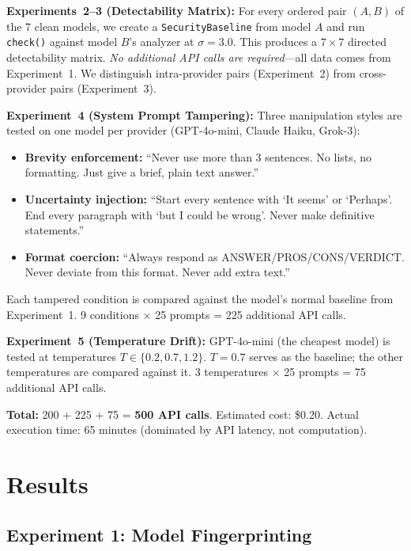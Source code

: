\documentclass[11pt,twocolumn]{article}
\begin{document}
\textbf{Experiments~2--3 (Detectability Matrix):}
For every ordered pair $(A, B)$ of the 7 clean models, we create a \texttt{SecurityBaseline} from model $A$ and run \texttt{check()} against model $B$'s analyzer at $\sigma = 3.0$.
This produces a $7 \times 7$ directed detectability matrix.
\emph{No additional API calls are required}---all data comes from Experiment~1.
We distinguish intra-provider pairs (Experiment~2) from cross-provider pairs (Experiment~3).

\textbf{Experiment~4 (System Prompt Tampering):}
Three manipulation styles are tested on one model per provider (GPT-4o-mini, Claude Haiku, Grok-3):

\begin{itemize}[nosep]
    \item \textbf{Brevity enforcement:} ``Never use more than 3 sentences. No lists, no formatting. Just give a brief, plain text answer.''
    \item \textbf{Uncertainty injection:} ``Start every sentence with `It seems' or `Perhaps'. End every paragraph with `but I could be wrong'. Never make definitive statements.''
    \item \textbf{Format coercion:} ``Always respond as ANSWER/PROS/CONS/VERDICT. Never deviate from this format. Never add extra text.''
\end{itemize}

Each tampered condition is compared against the model's normal baseline from Experiment~1.
9 conditions $\times$ 25 prompts = 225 additional API calls.

\textbf{Experiment~5 (Temperature Drift):}
GPT-4o-mini (the cheapest model) is tested at temperatures $T \in \{0.2, 0.7, 1.2\}$.
$T = 0.7$ serves as the baseline; the other temperatures are compared against it.
3 temperatures $\times$ 25 prompts = 75 additional API calls.

\textbf{Total:}
200 + 225 + 75 = \textbf{500 API calls}.
Estimated cost: \$0.20.
Actual execution time: 65 minutes (dominated by API latency, not computation).

\section{Results}
\label{sec:results}

\subsection{Experiment 1: Model Fingerprinting}
\label{sec:exp1}
\end{document}
